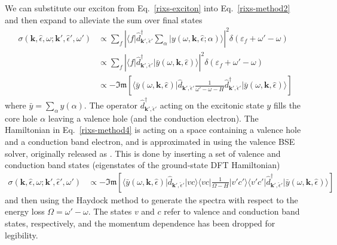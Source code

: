 \documentclass[11pt]{report}
\begin{document}
We can substitute our exciton from Eq.~\ref{rixs-exciton} into Eq.~\ref{rixs-method2} and then expand to alleviate the sum over final states
\begin{align}
\sigma( \mathbf{k}, \hat{\epsilon}, \omega; \mathbf{k}', \hat{\epsilon}', \omega' )
&\propto \sum_f \left|  \langle f \vert \hat{d}^\dagger_{\mathbf{k}', \hat{\epsilon}'} \sum_{\alpha}\vert  y(\omega,\mathbf{k}, \hat{\epsilon};\alpha) \rangle \right|^2 \delta( \varepsilon_f  + \omega'-\omega)
\label{rixs-method3}  \\
&\propto \sum_f \left|  \langle f \vert \hat{d}^\dagger_{\mathbf{k}', \hat{\epsilon}'}\vert  \bar{y}(\omega,\mathbf{k}, \hat{\epsilon}) \rangle \right|^2 \delta( \varepsilon_f  + \omega'-\omega)  \nonumber \\
&\propto -\mathfrak{Im} \left[ \langle \bar{y}(\omega,\mathbf{k}, \hat{\epsilon})  \vert  \hat{d}_{\mathbf{k}', \hat{\epsilon}'} \frac{1}{\omega'-\omega - H}  \hat{d}^\dagger_{\mathbf{k}', \hat{\epsilon}'} \vert  \bar{y}(\omega,\mathbf{k}, \hat{\epsilon}) \rangle \right]
\label{rixs-method4}
\end{align}
where $\bar{y} = \sum_\alpha y(\alpha)$. 
The operator $\hat{d}^\dagger_{\mathbf{k}', \hat{\epsilon}'}$ acting on the excitonic state $y$ fills the core hole $\alpha$ leaving a valence hole (and the conduction electron). 
The Hamiltonian in Eq.~\ref{rixs-method4} is acting on a space containing a valence hole and a conduction band electron, and is approximated in  using the valence BSE solver, originally released as . 
This is done by inserting a set of valence and conduction band states (eigenstates of the ground-state DFT Hamiltonian)
\begin{align}
\sigma( \mathbf{k}, \hat{\epsilon}, \omega; \mathbf{k}', \hat{\epsilon}', \omega' )
&\propto -\mathfrak{Im} \left[ \langle \bar{y}(\omega,\mathbf{k}, \hat{\epsilon})  \vert  \hat{d}_{\mathbf{k}', \hat{\epsilon}'} \vert vc \rangle \langle vc \vert  \frac{1}{\Omega - H}  \vert v'c' \rangle \langle v'c' \vert  \hat{d}^\dagger_{\mathbf{k}', \hat{\epsilon}'} \vert  \bar{y}(\omega,\mathbf{k}, \hat{\epsilon}) \rangle \right]
\label{rixs-haydock}
\end{align}
and then using the Haydock method to generate the spectra with respect to the energy loss $\Omega=\omega'-\omega$. 
The states $v$ and $c$ refer to valence and conduction band states, respectively, and the momentum dependence has been dropped for legibility.
\end{document}
